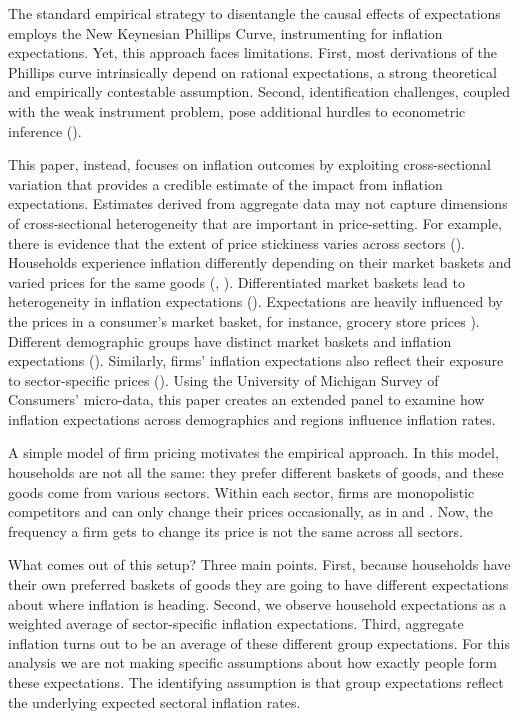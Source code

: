 \documentclass[12pt]{article}
\begin{document}
The standard empirical strategy to disentangle the causal effects of expectations employs the New Keynesian Phillips Curve, instrumenting for inflation expectations.  Yet, this approach faces limitations.  First, most derivations of the Phillips curve intrinsically depend on rational expectations, a strong theoretical and empirically contestable assumption.  Second, identification challenges, coupled with the weak instrument problem, pose additional hurdles to econometric inference (\cite{Stocketal:JEL2014}). 

This paper, instead, focuses on inflation outcomes by exploiting cross-sectional variation that provides a credible estimate of the impact from inflation expectations.  Estimates derived from aggregate data may not capture dimensions of cross-sectional heterogeneity that are important in price-setting.  For example, there is evidence that the extent of price stickiness varies across sectors (\cite{Cravinoetal:JME2020, Boivinetal:AER2009, Almas:AER2012}).  Households experience inflation differently depending on their market baskets and varied prices for the same goods (\cite{KaplanWohl:JME2017}, \cite{HobijnLagakos:2005}).  Differentiated market baskets lead to heterogeneity in inflation expectations (\cite{AngelicoGiacomo:WP}).  Expectations are heavily influenced by the prices in a consumer's market basket, for instance, grocery store prices \cite{Dacunto:groceryJPE, AngelicoGiacomo:WP}).  Different demographic groups have distinct market baskets and inflation expectations (\cite{BryanVenkatu, Dacunto:PNAS, deBruinetal:2010, DasKahnenNagel:2020}). Similarly, firms' inflation expectations also reflect their exposure to sector-specific prices (\cite{Andradeetal:JME2021}).  Using the University of Michigan Survey of Consumers' micro-data, this paper creates an extended panel to examine how inflation expectations across demographics and regions influence inflation rates.

A simple model of firm pricing motivates the empirical approach.  In this model, households are not all the same: they prefer different baskets of goods, and these goods come from various sectors.  Within each sector, firms are monopolistic competitors and can only change their prices occasionally, as in \cite{Calvo:JMoE1983} and \cite{WoodfordBook}.  Now, the frequency a firm gets to change its price is not the same across all sectors.

What comes out of this setup?  Three main points.  First, because households have their own preferred baskets of goods they are going to have different expectations about where inflation is heading.  Second, we observe household expectations as a weighted average of sector-specific inflation expectations.  Third, aggregate inflation turns out to be an average of these different group expectations.  For this analysis we are not making specific assumptions about how exactly people form these expectations.  The identifying assumption is that group expectations reflect the underlying expected sectoral inflation rates.
\end{document}

